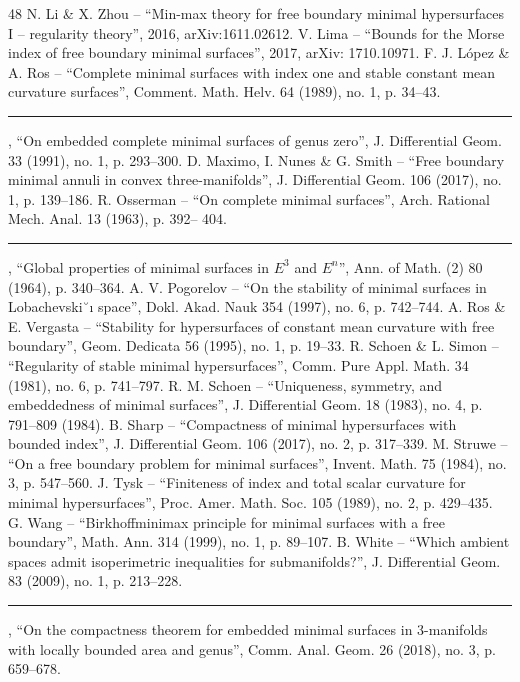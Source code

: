 \begin{thebibliography}{48}
 N. Li \& X. Zhou – “Min-max theory for free boundary minimal hypersurfaces I – regularity theory”, 2016, arXiv:1611.02612.
 V. Lima – “Bounds for the Morse index of free boundary minimal surfaces”, 2017, arXiv: 1710.10971.
 F. J. López \& A. Ros – “Complete minimal surfaces with index one and stable constant mean curvature surfaces”, Comment. Math. Helv. 64 (1989), no. 1, p. 34–43.
 \rule{2em}{.3pt} , “On embedded complete minimal surfaces of genus zero”, J. Diﬀerential Geom. 33 (1991), no. 1, p. 293–300.
 D. Maximo, I. Nunes \& G. Smith – “Free boundary minimal annuli in convex three-manifolds”, J. Diﬀerential Geom. 106 (2017), no. 1, p. 139–186.
 R. Osserman – “On complete minimal surfaces”, Arch. Rational Mech. Anal. 13 (1963), p. 392– 404.
 \rule{2em}{.3pt} , “Global properties of minimal surfaces in $E^3$ and $E^n$”, Ann. of Math. (2) 80 (1964), p. 340–364.
 A. V. Pogorelov – “On the stability of minimal surfaces in Lobachevski˘ı space”, Dokl. Akad. Nauk 354 (1997), no. 6, p. 742–744.
 A. Ros \& E. Vergasta – “Stability for hypersurfaces of constant mean curvature with free boundary”, Geom. Dedicata 56 (1995), no. 1, p. 19–33.
 R. Schoen \& L. Simon – “Regularity of stable minimal hypersurfaces”, Comm. Pure Appl. Math. 34 (1981), no. 6, p. 741–797.
 R. M. Schoen – “Uniqueness, symmetry, and embeddedness of minimal surfaces”, J. Diﬀerential Geom. 18 (1983), no. 4, p. 791–809 (1984).
 B. Sharp – “Compactness of minimal hypersurfaces with bounded index”, J. Diﬀerential Geom. 106 (2017), no. 2, p. 317–339.
 M. Struwe – “On a free boundary problem for minimal surfaces”, Invent. Math. 75 (1984), no. 3, p. 547–560.
 J. Tysk – “Finiteness of index and total scalar curvature for minimal hypersurfaces”, Proc. Amer. Math. Soc. 105 (1989), no. 2, p. 429–435.
 G. Wang – “Birkhoﬀminimax principle for minimal surfaces with a free boundary”, Math. Ann. 314 (1999), no. 1, p. 89–107.
 B. White – “Which ambient spaces admit isoperimetric inequalities for submanifolds?”, J. Differential Geom. 83 (2009), no. 1, p. 213–228.
 \rule{2em}{.3pt} , “On the compactness theorem for embedded minimal surfaces in 3-manifolds with locally bounded area and genus”, Comm. Anal. Geom. 26 (2018), no. 3, p. 659–678.
\end{thebibliography}
\endgroup
